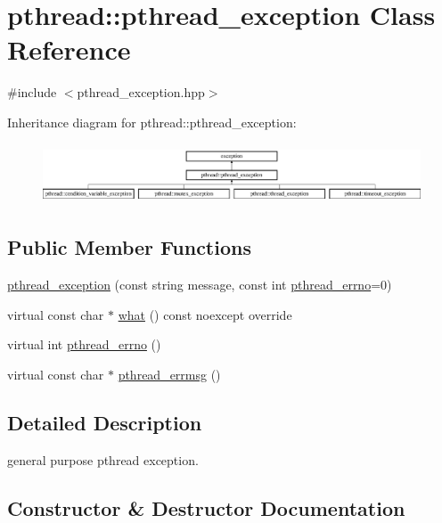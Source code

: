 \hypertarget{classpthread_1_1pthread__exception}{}\section{pthread\+:\+:pthread\+\_\+exception Class Reference}
\label{classpthread_1_1pthread__exception}


{\ttfamily \#include $<$pthread\+\_\+exception.\+hpp$>$}

Inheritance diagram for pthread\+:\+:pthread\+\_\+exception\+:\begin{figure}[H]
\begin{center}
\leavevmode
\includegraphics[height=1.794872cm]{classpthread_1_1pthread__exception}
\end{center}
\end{figure}
\subsection*{Public Member Functions}
\begin{DoxyCompactItemize}
\item 
\hyperlink{classpthread_1_1pthread__exception_a157d4379b6eddcc82ca504534c51abe6}{pthread\+\_\+exception} (const string message, const int \hyperlink{classpthread_1_1pthread__exception_a8a5c22a403ebd14635e912295fe02a1e}{pthread\+\_\+errno}=0)
\item 
virtual const char $\ast$ \hyperlink{classpthread_1_1pthread__exception_a908666a0dd622c9a2a008e89a15d8fc7}{what} () const  noexcept override
\item 
virtual int \hyperlink{classpthread_1_1pthread__exception_a8a5c22a403ebd14635e912295fe02a1e}{pthread\+\_\+errno} ()
\item 
virtual const char $\ast$ \hyperlink{classpthread_1_1pthread__exception_aa2371eb23800817723174186450e9716}{pthread\+\_\+errmsg} ()
\end{DoxyCompactItemize}


\subsection{Detailed Description}
general purpose pthread exception. 

\subsection{Constructor \& Destructor Documentation}

